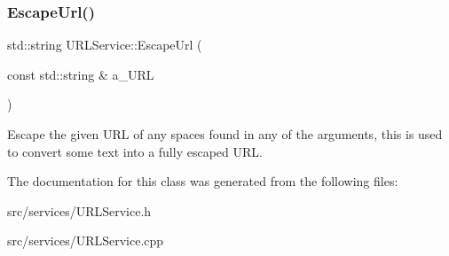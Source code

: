 \subsubsection{\texorpdfstring{Escape\+Url()}{EscapeUrl()}}
{\footnotesize\ttfamily std\+::string U\+R\+L\+Service\+::\+Escape\+Url (\begin{DoxyParamCaption}\item[{const std\+::string \&}]{a\+\_\+\+U\+RL }\end{DoxyParamCaption})\hspace{0.3cm}{\ttfamily [static]}}

Escape the given U\+RL of any spaces found in any of the arguments, this is used to convert some text into a fully escaped U\+RL. 

The documentation for this class was generated from the following files\+:\begin{DoxyCompactItemize}
\item 
src/services/U\+R\+L\+Service.\+h\item 
src/services/U\+R\+L\+Service.\+cpp\end{DoxyCompactItemize}
